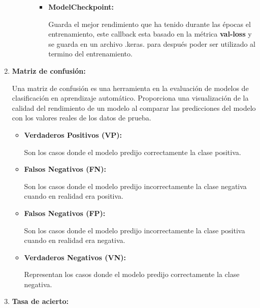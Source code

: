 \begin{enumerate}
\begin{itemize}
\begin{itemize}
\begin{itemize}
	 	 
	
		\item
		\textbf{ModelCheckpoint:}		
	
	Guarda el mejor rendimiento que ha tenido durante las épocas el entrenamiento, este callback esta basado en la métrica \textbf{val-loss} y se guarda en un archivo .keras. para después poder ser utilizado al termino del entrenamiento.
	

		\end{itemize}	
	
	\end{itemize}

\end{itemize}



\item
\textbf{Matriz de confusión:}

Una matriz de confusión es una herramienta en la evaluación de modelos de clasificación en aprendizaje automático. Proporciona una visualización de la calidad del rendimiento de un modelo al comparar las predicciones del modelo con los valores reales de los datos de prueba.

\begin{itemize}

	\item
	\textbf{Verdaderos Positivos (VP):}
	
	Son los casos donde el modelo predijo correctamente la clase positiva.
	
	\item
	\textbf{Falsos Negativos (FN):}
	
	Son los casos donde el modelo predijo incorrectamente la clase negativa cuando en realidad era positiva.
	
	\item
	\textbf{Falsos Negativos (FP):}
	
	Son los casos donde el modelo predijo incorrectamente la clase positiva cuando en realidad era negativa.
	
	\item
	\textbf{Verdaderos Negativos (VN):}
	
	Representan los casos donde el modelo predijo correctamente la clase negativa.

\end{itemize}


\item
\textbf{Tasa de acierto:}


\end{enumerate}
